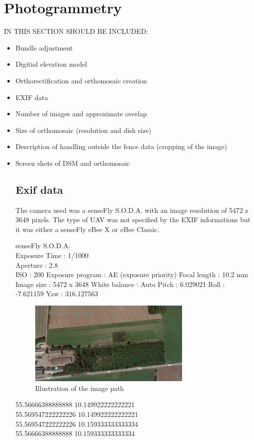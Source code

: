 \documentclass[../Head/Main.tex]{subfiles}
\begin{document}
\section{Photogrammetry}
IN THIS SECTION SHOULD BE INCLUDED:
\begin{itemize}
\item Bundle adjustment
\item Digitial elevation model
\item Orthorectification and orthomosaic creation
\item EXIF data
\item Number of images and approximate overlap
\item Size of orthomosaic (resolution and disk size)
\item Description of handling outside the fence data (cropping of the image)
\item Screen shots of DSM and orthomosaic

\subsection{Exif data}
The camera used was a senseFly S.O.D.A. with an image resolution of 5472 z 3648 pixels. The type of UAV was not specified by the EXIF informations but it was either a senseFly eBee X or eBee Classic.


senseFly S.O.D.A.\\
Exposure Time : 1/1000\\
Aperture      : 2.8\\
ISO           : 200
Exposure program : AE (exposure priority)
Focal length  : 10.2 mm
Image size    : 5472 x 3648
White balance : Auto
Pitch                           : 6.029021
Roll                            : -7.621159
Yaw                             : 316.127563



\begin{figure}[H]
	\centering
	\includegraphics[width=0.75\textwidth]{../Figures/Flight_path}
	\caption{Illustration of the image path}
	\label{fig:flight_path}
\end{figure}

55.56666388888888 10.149922222222221\\
55.569547222222226 10.149922222222221\\
55.569547222222226 10.159333333333334\\
55.56666388888888 10.159333333333334\\

\end{itemize}
\end{document}
